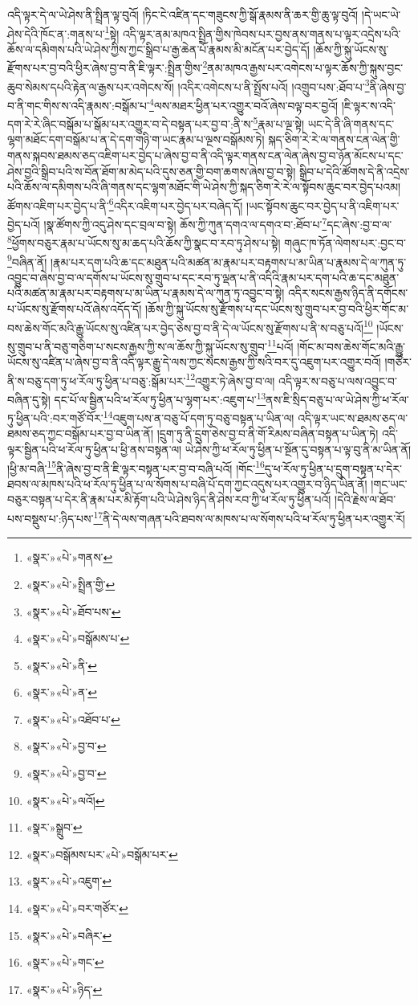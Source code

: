 འདི་ལྟར་དེ་ལ་ཡེ་ཤེས་ནི་སྤྲིན་ལྟ་བུའོ། །ཏིང་ངེ་འཛིན་དང་གཟུངས་ཀྱི་སྒོ་རྣམས་ནི་ཆར་གྱི་ཆུ་ལྟ་བུའོ། །དེ་ཡང་ཡེ་ཤེས་དེའི་ཁོང་ན་:གནས་པ་\footnote{«སྣར་»«པེ་»གནས་}སྟེ། འདི་ལྟར་ནམ་མཁའ་སྤྲིན་གྱིས་ཁེབས་པར་བྱས་ནས་གནས་པ་ལྟར་འདྲེས་པའི་ཆོས་ལ་དམིགས་པའི་ཡེ་ཤེས་ཀྱིས་ཀྱང་སྒྲིབ་པ་རྒྱ་ཆེན་པོ་རྣམས་མི་མངོན་པར་བྱེད་དོ། །ཆོས་ཀྱི་སྐུ་ཡོངས་སུ་རྫོགས་པར་བྱ་བའི་ཕྱིར་ཞེས་བྱ་བ་ནི་ཇི་ལྟར་:སྤྲིན་གྱིས་\footnote{«སྣར་»«པེ་»སྤྲིན་གྱི་}ནམ་མཁའ་རྒྱས་པར་འགེངས་པ་ལྟར་ཆོས་ཀྱི་སྐུས་བྱང་ཆུབ་སེམས་དཔའི་རྟེན་ལ་རྒྱས་པར་འགེངས་སོ། །འདིར་འགེངས་པ་ནི་སྤྲོས་པའོ། །འགྲུབ་པས་:ཐོབ་པ་\footnote{«སྣར་»«པེ་»ཐོབ་པས་}ནི་ཞེས་བྱ་བ་ནི་གང་གིས་ས་འདི་རྣམས་:བསྒོམ་པ་\footnote{«སྣར་»«པེ་»བསྒོམས་པ་}ལས་མཐར་ཕྱིན་པར་འགྱུར་བའོ་ཞེས་བལྟ་བར་བྱའོ། །ཇི་ལྟར་ས་འདི་དག་རེ་རེ་ཞིང་བསྒོམ་པ་སྒོམ་པར་འགྱུར་བ་དེ་བསྟན་པར་བྱ་བ་:ནི་ས་\footnote{«སྣར་»«པེ་»ནི་}རྣམ་པ་ལྔ་སྟེ། ཡང་དེ་ནི་ཞི་གནས་དང་ལྷག་མཐོང་དག་བསྒོམ་པ་ན་དེ་དག་གཉི་ག་ཡང་རྣམ་པ་ལྔས་བསྒོམས་ཏེ། སྐད་ཅིག་རེ་རེ་ལ་གནས་ངན་ལེན་གྱི་གནས་སྐབས་ཐམས་ཅད་འཇིག་པར་བྱེད་པ་ཞེས་བྱ་བ་ནི་འདི་ལྟར་གནས་ངན་ལེན་ཞེས་བྱ་བ་ཉོན་མོངས་པ་དང་ཤེས་བྱའི་སྒྲིབ་པའི་ས་བོན་ཐོག་མ་མེད་པའི་དུས་ཅན་གྱི་བག་ཆགས་ཞེས་བྱ་བ་སྟེ། སྒྲིབ་པ་དེའི་ཚོགས་དེ་ནི་འདྲེས་པའི་ཆོས་ལ་དམིགས་པའི་ཞི་གནས་དང་ལྷག་མཐོང་གི་ཡེ་ཤེས་ཀྱི་སྐད་ཅིག་རེ་རེ་ལ་སྟོབས་ཆུང་བར་བྱེད་པའམ། ཚོགས་འཇིག་པར་བྱེད་པ་ནི་\footnote{«སྣར་»«པེ་»ན་}འདིར་འཇིག་པར་བྱེད་པར་བཞེད་དོ། །ཡང་སྟོབས་ཆུང་བར་བྱེད་པ་ནི་འཇིག་པར་བྱེད་པའོ། །སྣ་ཚོགས་ཀྱི་འདུ་ཤེས་དང་བྲལ་བ་སྟེ། ཆོས་ཀྱི་ཀུན་དགའ་ལ་དགའ་བ་:ཐོབ་པ་\footnote{«སྣར་»«པེ་»འཐོབ་པ་}དང་ཞེས་:བྱ་བ་ལ་\footnote{«སྣར་»«པེ་»བྱ་བ་}ཕྱོགས་བཅུར་རྣམ་པ་ཡོངས་སུ་མ་ཆད་པའི་ཆོས་ཀྱི་སྣང་བ་རབ་ཏུ་ཤེས་པ་སྟེ། གཞུང་ཁ་ཏོན་ལེགས་པར་:བྱང་བ་\footnote{«སྣར་»«པེ་»བྱ་བ་}བཞིན་ནོ། །རྣམ་པར་དག་པའི་ཆ་དང་མཐུན་པའི་མཚན་མ་རྣམ་པར་བརྟགས་པ་མ་ཡིན་པ་རྣམས་དེ་ལ་ཀུན་ཏུ་འབྱུང་བ་ཞེས་བྱ་བ་ལ་དགོས་པ་ཡོངས་སུ་གྲུབ་པ་དང་རབ་ཏུ་ལྡན་པ་ནི་འདིའི་རྣམ་པར་དག་པའི་ཆ་དང་མཐུན་པའི་མཚན་མ་རྣམ་པར་བརྟགས་པ་མ་ཡིན་པ་རྣམས་དེ་ལ་ཀུན་ཏུ་འབྱུང་བ་སྟེ། འདིར་སངས་རྒྱས་ཉིད་ནི་དགོངས་པ་ཡོངས་སུ་རྫོགས་པའོ་ཞེས་འདོད་དོ། །ཆོས་ཀྱི་སྐུ་ཡོངས་སུ་རྫོགས་པ་དང་ཡོངས་སུ་གྲུབ་པར་བྱ་བའི་ཕྱིར་གོང་མ་བས་ཆེས་གོང་མའི་རྒྱུ་ཡོངས་སུ་འཛིན་པར་བྱེད་ཅེས་བྱ་བ་ནི་དེ་ལ་ཡོངས་སུ་རྫོགས་པ་ནི་ས་བཅུ་པའོ།\footnote{«སྣར་»«པེ་»ལའོ།} །ཡོངས་སུ་གྲུབ་པ་ནི་བཅུ་གཅིག་པ་སངས་རྒྱས་ཀྱི་ས་ལ་ཆོས་ཀྱི་སྐུ་ཡོངས་སུ་གྲུབ་\footnote{«སྣར་»སྒྲུབ་}པའོ། །གོང་མ་བས་ཆེས་གོང་མའི་རྒྱུ་ཡོངས་སུ་འཛིན་པ་ཞེས་བྱ་བ་ནི་འདི་ལྟར་རྒྱུ་དེ་ལས་ཀྱང་སངས་རྒྱས་ཀྱི་སའི་བར་དུ་འཇུག་པར་འགྱུར་བའོ། །གཙོར་ནི་ས་བཅུ་དག་ཏུ་ཕ་རོལ་ཏུ་ཕྱིན་པ་བཅུ་:སྒོམ་པར་\footnote{«སྣར་»བསྒོམས་པར་«པེ་»བསྒོམ་པར་}འགྱུར་ཏེ་ཞེས་བྱ་བ་ལ། འདི་ལྟར་ས་བཅུ་པ་ལས་འབྱུང་བ་བཞིན་དུ་སྟེ། དང་པོ་ལ་སྦྱིན་པའི་ཕ་རོལ་ཏུ་ཕྱིན་པ་ལྷག་པར་:འཇུག་པ་\footnote{«སྣར་»«པེ་»འཇུག་}ནས་ཇི་སྲིད་བཅུ་པ་ལ་ཡེ་ཤེས་ཀྱི་ཕ་རོལ་ཏུ་ཕྱིན་པའི་:བར་གཙོ་བོར་\footnote{«སྣར་»«པེ་»བར་གཙོར་}འཇུག་པས་ན་བཅུ་པོ་དག་ཏུ་བཅུ་བསྟན་པ་ཡིན་ལ། འདི་ལྟར་ཡང་ས་ཐམས་ཅད་ལ་ཐམས་ཅད་ཀྱང་བསྒོམ་པར་བྱ་བ་ཡིན་ནོ། །དྲུག་ཏུ་ནི་དྲུག་ཅེས་བྱ་བ་ནི་གོ་རིམས་བཞིན་བསྟན་པ་ཡིན་ཏེ། འདི་ལྟར་སྦྱིན་པའི་ཕ་རོལ་ཏུ་ཕྱིན་པ་ཕྱི་ནས་བསྟན་ལ། ཡེ་ཤེས་ཀྱི་ཕ་རོལ་ཏུ་ཕྱིན་པ་སྔོན་དུ་བསྟན་པ་ལྟ་བུ་ནི་མ་ཡིན་ནོ། །ཕྱི་མ་བཞི་\footnote{«སྣར་»«པེ་»བཞིར་}ནི་ཞེས་བྱ་བ་ནི་ཇི་ལྟར་བསྟན་པར་བྱ་བ་བཞི་པའོ། །གོང་\footnote{«སྣར་»«པེ་»གང་}དུ་ཕ་རོལ་ཏུ་ཕྱིན་པ་དྲུག་བསྟན་པ་དེར་ཐབས་ལ་མཁས་པའི་ཕ་རོལ་ཏུ་ཕྱིན་པ་ལ་སོགས་པ་བཞི་པོ་དག་ཀྱང་འདུས་པར་འགྱུར་བ་ཉིད་ཡིན་ནོ། །གང་ཡང་བཅུར་བསྟན་པ་དེར་ནི་རྣམ་པར་མི་རྟོག་པའི་ཡེ་ཤེས་ཉིད་ནི་ཤེས་རབ་ཀྱི་ཕ་རོལ་ཏུ་ཕྱིན་པའོ། །དེའི་རྗེས་ལ་ཐོབ་པས་བསྡུས་པ་:ཉིད་པས་\footnote{«སྣར་»«པེ་»ཉིད་}ནི་དེ་ལས་གཞན་པའི་ཐབས་ལ་མཁས་པ་ལ་སོགས་པའི་ཕ་རོལ་ཏུ་ཕྱིན་པར་འགྱུར་རོ། 